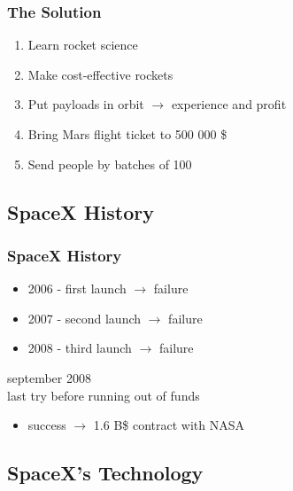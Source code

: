 \begin{frame}
    \frametitle{The Solution}
    \begin{enumerate}
        \item Learn rocket science
        \pause
        \item Make cost-effective rockets
        \pause
        \item Put payloads in orbit $\rightarrow$ experience and profit
        \pause
        \item Bring Mars flight ticket to 500 000 \$
        \pause
        \item Send people by batches of 100
    \end{enumerate}
\end{frame}

\subsection{SpaceX History}

\begin{frame}
    \frametitle{SpaceX History}

    \begin{itemize}
        \item 2006 - first launch  $\rightarrow$ failure
        \item 2007 - second launch $\rightarrow$ failure
        \item 2008 - third launch  $\rightarrow$ failure

    \end{itemize}
    \vspace{1em}
    \pause

    september 2008\\
    last try before running out of funds\\
    \begin{itemize}
        \item success $\rightarrow$ 1.6 B\$ contract with NASA
    \end{itemize}
\end{frame}

\subsection{SpaceX's Technology}

